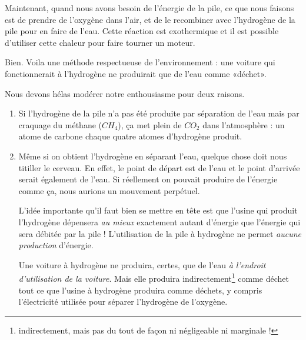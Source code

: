 Maintenant, quand nous avons besoin de l'énergie de la pile, ce que nous faisons est de prendre de l'oxygène dans l'air, et de le recombiner avec l'hydrogène de la pile pour en faire de l'eau. Cette réaction est exothermique et il est possible d'utiliser cette chaleur pour faire tourner un moteur.

\begin{idee}
Bien. Voila une méthode respectueuse de l'environnement : une voiture qui fonctionnerait à l'hydrogène ne produirait que de l'eau comme «déchet».
\end{idee}

Nous devons hélas modérer notre enthousiasme pour deux raisons.

\begin{enumerate}

	\item
		Si l'hydrogène de la pile n'a pas été produite par séparation de l'eau mais par craquage du méthane ($CH_4$), ça met plein de $CO_2$ dans l'atmosphère : un atome de carbone chaque quatre atomes d'hydrogène produit.

	\item
		Même si on obtient l'hydrogène en séparant l'eau, quelque chose doit nous titiller le cerveau. En effet, le point de départ est de l'eau et le point d'arrivée serait également de l'eau. Si réellement on pouvait produire de l'énergie comme ça, nous aurions un mouvement perpétuel.

		L'idée importante qu'il faut bien se mettre en tête est que l'usine qui produit l'hydrogène dépensera \emph{au mieux} exactement autant d'énergie que l'énergie qui sera débitée par la pile ! L'utilisation de la pile à hydrogène ne permet \emph{aucune production} d'énergie.

		Une voiture à hydrogène ne produira, certes, que de l'eau \emph{à l'endroit d'utilisation de la voiture}. Mais elle produira indirectement\footnote{indirectement, mais pas du tout de façon ni négligeable ni marginale !} comme déchet tout ce que l'usine à hydrogène produira comme déchets, y compris l'électricité utilisée pour séparer l'hydrogène de l'oxygène.

\end{enumerate}

